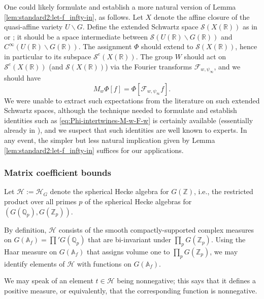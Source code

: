 \begin{remark}\label{rmk:one-could-likely}
  One could likely formulate and establish a more natural version of Lemma \ref{lem:standard2:let-f_infty-in}, as follows.  Let $X$ denote the affine closure of the quasi-affine variety $U \backslash G$.  Define the extended Schwartz space $\mathcal{S}(X(\mathbb{R}))$ as in \cite[Definition 5.5]{2021arXiv210310261G} or \cite[\S7.1]{MR1694894}; it should be a space intermediate between $\mathcal{S}(U(\mathbb{R}) \backslash G(\mathbb{R}))$ and $C^\infty(U(\mathbb{R}) \backslash G(\mathbb{R}))$.  The assignment $\Phi$ should extend to $\mathcal{S}(X(\mathbb{R}))$, hence in particular to its subspace $\mathcal{S}^e(X(\mathbb{R}))$.  The group $W$ should act on $\mathcal{S}^e(X(\mathbb{R}))$ (and $\mathcal{S}(X(\mathbb{R}))$) via the Fourier transforms $\mathcal{F}_{w,\psi_\infty}$, and we should have
  \begin{equation}\label{eq:Phi-intertwines-M-w-F-w}
    M_w \Phi[f] = \Phi[\mathcal{F}_{w,\psi_\infty} f].
  \end{equation}
  We were unable to extract such expectations from the literature on such extended Schwartz spaces, although the technique needed to formulate and establish identities such as \eqref{eq:Phi-intertwines-M-w-F-w} is certainly available (essentially already in \cite[\S3.5]{MR3468638}), and we suspect that such identities are well known to experts.  In any event, the simpler but less natural implication given by Lemma \ref{lem:standard2:let-f_infty-in} suffices for our applications.
\end{remark}

\subsubsection{Matrix coefficient bounds}\label{sec:matr-coeff-bounds}
Let $\mathcal{H} := \mathcal{H}_G$ denote the spherical Hecke algebra for $G(\mathbb{Z})$, i.e., the restricted product over all primes $p$ of the spherical Hecke algebras for $(G(\mathbb{Q}_p), G(\mathbb{Z}_p))$.

By definition, $\mathcal{H}$ consists of the smooth compactly-supported complex measures on $G(\mathbb{A}_f) = \prod ' G(\mathbb{Q}_p)$ that are bi-invariant under $\prod_p G(\mathbb{Z}_p)$.  Using the Haar measure on $G(\mathbb{A}_f)$ that assigns volume one to $\prod_{p} G(\mathbb{Z}_p)$, we may identify elements of $\mathcal{H}$ with functions on $G(\mathbb{A}_f)$.

We may speak of an element $t \in \mathcal{H}$ being nonnegative; this says that it defines a positive measure, or equivalently, that the corresponding function is nonnegative.

